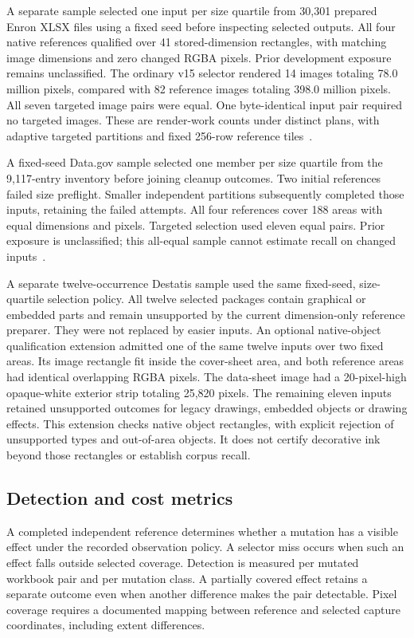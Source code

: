 A separate sample selected one input per size quartile from 30,301 prepared
Enron XLSX files using a fixed seed before inspecting selected outputs.
All four native references qualified over 41 stored-dimension rectangles,
with matching image dimensions and zero changed RGBA pixels.
Prior development exposure remains unclassified.
The ordinary v15 selector rendered 14 images totaling 78.0 million pixels,
compared with 82 reference images totaling 398.0 million pixels.
All seven targeted image pairs were equal. One byte-identical input pair
required no targeted images. These are render-work counts under distinct
plans, with adaptive targeted partitions and fixed 256-row reference
tiles~\cite{preparedenronreference}.

A fixed-seed Data.gov sample selected one member per size quartile from the
9,117-entry inventory before joining cleanup outcomes. Two initial references
failed size preflight. Smaller independent partitions subsequently completed
those inputs, retaining the failed attempts. All four references cover 188 areas
with equal dimensions and pixels. Targeted selection used eleven equal pairs.
Prior exposure is unclassified; this all-equal sample cannot estimate recall
on changed inputs~\cite{datagovreference,datagovsupplementary}.

A separate twelve-occurrence Destatis sample used the same fixed-seed,
size-quartile selection policy. All twelve selected packages contain graphical
or embedded parts and remain unsupported by the current dimension-only reference
preparer. They were not replaced by easier inputs. An optional native-object
qualification extension admitted one of the same twelve inputs over two fixed
areas. Its image rectangle fit inside the cover-sheet area, and both reference
areas had identical overlapping RGBA pixels. The data-sheet image had a
20-pixel-high opaque-white exterior strip totaling 25,820 pixels. The remaining
eleven inputs retained unsupported outcomes for legacy drawings, embedded
objects or drawing effects. This extension checks native object rectangles,
with explicit rejection of unsupported types and out-of-area objects. It does
not certify decorative ink beyond those rectangles or establish corpus recall.

\subsection{Detection and cost metrics}
A completed independent reference determines whether a mutation has a visible
effect under the recorded observation policy. A selector miss occurs when such
an effect falls outside selected coverage. Detection is measured per mutated
workbook pair and per mutation class. A partially covered effect retains a
separate outcome even when another difference makes the pair detectable.
Pixel coverage requires a documented mapping between reference and selected
capture coordinates, including extent differences.

